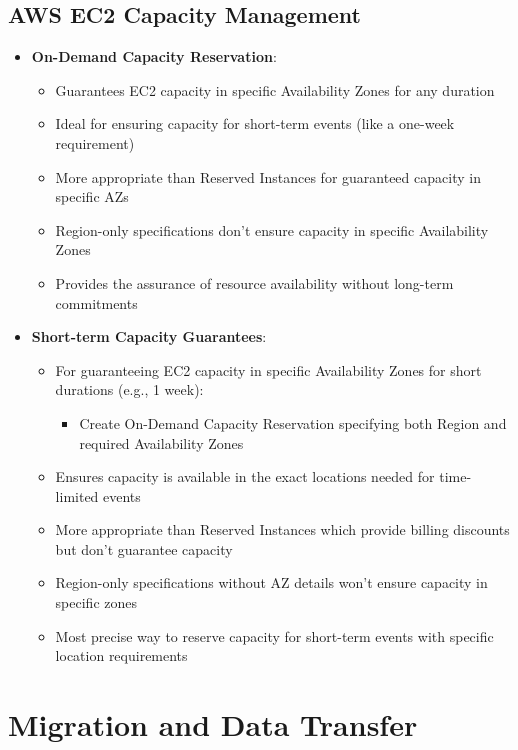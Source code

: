 \documentclass[11pt,a4paper]{report}
\begin{document}
\section{AWS EC2 Capacity Management}

\begin{itemize}
  \item \textbf{On-Demand Capacity Reservation}:
\begin{itemize}
  \item Guarantees EC2 capacity in specific Availability Zones for any duration
  \item Ideal for ensuring capacity for short-term events (like a one-week requirement)
  \item More appropriate than Reserved Instances for guaranteed capacity in specific AZs
  \item Region-only specifications don't ensure capacity in specific Availability Zones
  \item Provides the assurance of resource availability without long-term commitments
\end{itemize}
  \item \textbf{Short-term Capacity Guarantees}:
\begin{itemize}
  \item For guaranteeing EC2 capacity in specific Availability Zones for short durations (e.g., 1 week):
\begin{itemize}
  \item Create On-Demand Capacity Reservation specifying both Region and required Availability Zones
\end{itemize}
  \item Ensures capacity is available in the exact locations needed for time-limited events
  \item More appropriate than Reserved Instances which provide billing discounts but don't guarantee capacity
  \item Region-only specifications without AZ details won't ensure capacity in specific zones
  \item Most precise way to reserve capacity for short-term events with specific location requirements
\end{itemize}
\end{itemize}


\chapter{Migration and Data Transfer}
\end{document}
